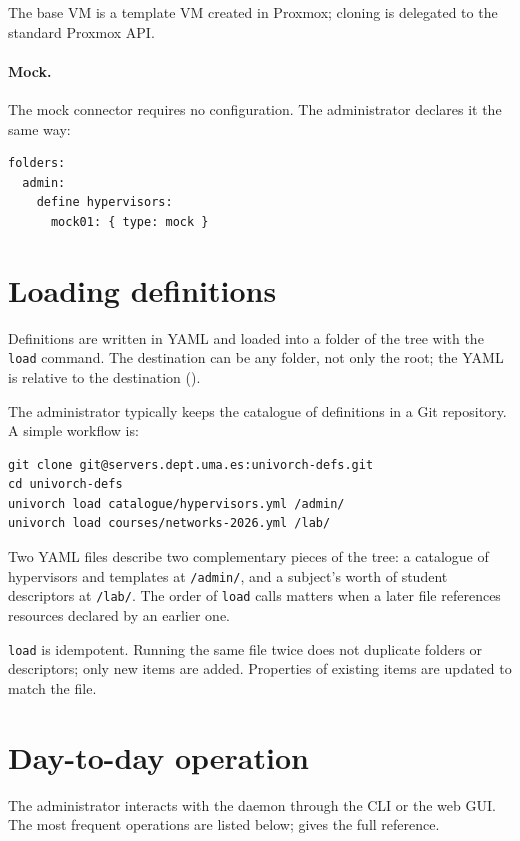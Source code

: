 The base VM is a template VM created in Proxmox; cloning is
delegated to the standard Proxmox API.

\paragraph{Mock.}
The mock connector requires no configuration. The administrator
declares it the same way:

\begin{verbatim}
folders:
  admin:
    define hypervisors:
      mock01: { type: mock }
\end{verbatim}

\section{Loading definitions}

Definitions are written in YAML and loaded into a folder of the
tree with the \texttt{load} command. The destination can be any
folder, not only the root; the YAML is relative to the
destination ().

The administrator typically keeps the catalogue of definitions in
a Git repository. A simple workflow is:

\begin{verbatim}
git clone git@servers.dept.uma.es:univorch-defs.git
cd univorch-defs
univorch load catalogue/hypervisors.yml /admin/
univorch load courses/networks-2026.yml /lab/
\end{verbatim}

Two YAML files describe two complementary pieces of the tree: a
catalogue of hypervisors and templates at \texttt{/admin/}, and a
subject's worth of student descriptors at \texttt{/lab/}. The
order of \texttt{load} calls matters when a later file references
resources declared by an earlier one.

\texttt{load} is idempotent. Running the same file twice does not
duplicate folders or descriptors; only new items are added.
Properties of existing items are updated to match the file.

\section{Day-to-day operation}

The administrator interacts with the daemon through the CLI or
the web GUI. The most frequent operations are listed below;
 gives the full reference.

